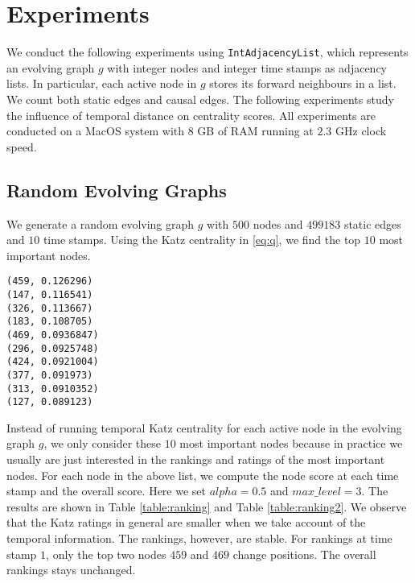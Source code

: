 \documentclass[12pt]{article}
\theoremstyle{definition}
\begin{document}
\section{Experiments}
\label{sec:experiments}

We conduct the following experiments using \texttt{IntAdjacencyList}, which represents an evolving graph $g$ with integer nodes and integer time stamps as adjacency lists. In particular, each active node in $g$ stores its forward neighbours in a list. We count both static edges and causal edges.
The following experiments study the influence of temporal distance on centrality scores. All experiments are conducted on a MacOS system with $8$ GB of RAM running at $2.3$ GHz clock speed.

\subsection{Random Evolving Graphs}
\label{sec:random}

We generate a random evolving graph $g$ with $500$ nodes and $499183$ static edges and $10$ time stamps. Using the Katz centrality in \eqref{eq:q}, we find the top $10$ most important nodes.
\begin{lstlisting}
(459, 0.126296)
(147, 0.116541)
(326, 0.113667)
(183, 0.108705)
(469, 0.0936847)
(296, 0.0925748)
(424, 0.0921004)
(377, 0.091973)
(313, 0.0910352)
(127, 0.089123)
\end{lstlisting}
Instead of running temporal Katz centrality for each active node in the evolving graph $g$,
we only consider these $10$ most important nodes because in practice we usually are just interested in the rankings and ratings of the most important nodes. For each node in the above list,
we compute the node score at each time stamp and the overall score.
Here we set $alpha = 0.5$  and $max\_level = 3$.  The results are shown in Table \ref{table:ranking}
and Table \ref{table:ranking2}.
We observe that the Katz ratings in general are smaller when we take account of the temporal information. The rankings, however, are stable. For rankings at time stamp $1$,
only the top two nodes $459$ and $469$ change positions.
The overall rankings stays unchanged.
\end{document}
